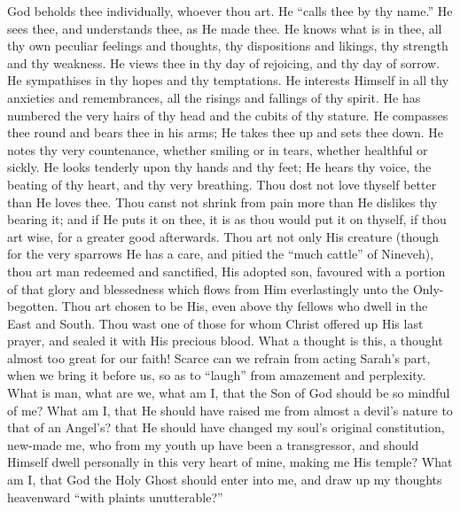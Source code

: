 God beholds thee individually, whoever thou art. He ``calls
thee by thy name.'' He sees thee, and understands thee, as He made
thee. He knows what is in thee, all thy own peculiar feelings and
thoughts, thy dispositions and likings, thy strength and thy weakness.
He views thee in thy day of rejoicing, and thy day of sorrow. He
sympathises in thy hopes and thy temptations. He interests Himself in
all thy anxieties and remembrances, all the risings and fallings of
thy spirit. He has numbered the very hairs of thy head and the cubits
of thy stature. He compasses thee round and bears thee in his arms; He
takes thee up and sets thee down. He notes thy very countenance,
whether smiling or in tears, whether healthful or sickly. He looks
tenderly upon thy hands and thy feet; He hears thy voice, the beating
of thy heart, and thy very breathing. Thou dost not love thyself
better than He loves thee. Thou canst not shrink from pain more than
He dislikes thy bearing it; and if He puts it on thee, it is as thou
would put it on thyself, if thou art wise, for a greater good
afterwards. Thou art not only His creature (though for the very
sparrows He has a care, and pitied the ``much cattle'' of
Nineveh), thou art man redeemed and sanctified, His adopted son,
favoured with a portion of that glory and blessedness which flows from
Him everlastingly unto the Only-begotten. Thou art chosen to be His,
even above thy fellows who dwell in the East and South. Thou wast one
of those for whom Christ offered up His last prayer, and sealed it
with His precious blood. What a thought is this, a thought almost too
great for our faith! Scarce can we refrain from acting Sarah's part,
when we bring it before us, so as to ``laugh'' from amazement
and perplexity. What is man, what are we, what am I, that the Son of
God should be so mindful of me? What am I, that He should have raised
me from almost a devil's nature to that of an Angel's? that He should
have changed my soul's original constitution, new-made me, who from my
youth up have been a transgressor, and should Himself dwell personally
in this very heart of mine, making me His temple? What am I, that God
the Holy Ghost should enter into me, and draw up my thoughts
heavenward ``with plaints unutterable?''

